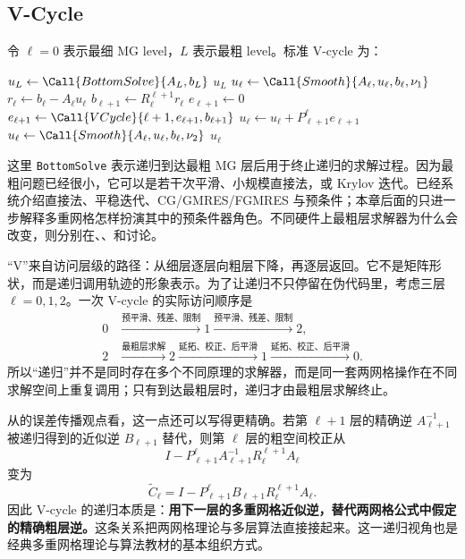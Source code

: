 \subsection{V-Cycle}
\label{sec:v-cycle}

令 $\ell=0$ 表示最细 MG level，$L$ 表示最粗 level。标准 V-cycle 为：
\begin{algorithm}[htbp]
\caption{递归 V-cycle}
\begin{algorithmic}[1]
    \State $u_L\gets\Call{BottomSolve}{A_L,b_L}$
    \State \Return $u_L$
  \EndIf
  \State $u_\ell\gets\Call{Smooth}{A_\ell,u_\ell,b_\ell,\nu_1}$
  \State $r_\ell\gets b_\ell-A_\ell u_\ell$
  \State $b_{\ell+1}\gets R_\ell^{\ell+1}r_\ell$
  \State $e_{\ell+1}\gets0$
  \State $e_{\ell+1}\gets\Call{VCycle}{\ell+1,e_{\ell+1},b_{\ell+1}}$
  \State $u_\ell\gets u_\ell+P_{\ell+1}^{\ell}e_{\ell+1}$
  \State $u_\ell\gets\Call{Smooth}{A_\ell,u_\ell,b_\ell,\nu_2}$
  \State \Return $u_\ell$
\EndFunction
\end{algorithmic}
\end{algorithm}

这里 \texttt{BottomSolve} 表示递归到达最粗 MG 层后用于终止递归的求解过程。因为最粗问题已经很小，它可以是若干次平滑、小规模直接法，或 Krylov 迭代。已经系统介绍直接法、平稳迭代、CG/GMRES/FGMRES 与预条件；本章后面的只进一步解释多重网格怎样扮演其中的预条件器角色。不同硬件上最粗层求解器为什么会改变，则分别在、、和讨论。

“V”来自访问层级的路径：从细层逐层向粗层下降，再逐层返回。它不是矩阵形状，而是递归调用轨迹的形象表示。为了让递归不只停留在伪代码里，考虑三层 $\ell=0,1,2$。一次 V-cycle 的实际访问顺序是
\begin{align}
0&\xrightarrow{\text{预平滑、残差、限制}}1
\xrightarrow{\text{预平滑、残差、限制}}2,
\\
2&\xrightarrow{\text{最粗层求解}}2
\xrightarrow{\text{延拓、校正、后平滑}}1
\xrightarrow{\text{延拓、校正、后平滑}}0.
\end{align}
所以“递归”并不是同时存在多个不同原理的求解器，而是同一套两网格操作在不同求解空间上重复调用；只有到达最粗层时，递归才由最粗层求解终止。

从的误差传播观点看，这一点还可以写得更精确。若第 $\ell+1$ 层的精确逆 $A_{\ell+1}^{-1}$ 被递归得到的近似逆 $B_{\ell+1}$ 替代，则第 $\ell$ 层的粗空间校正从
\begin{equation}
I-P_{\ell+1}^{\ell}A_{\ell+1}^{-1}R_{\ell}^{\ell+1}A_\ell
\end{equation}
变为
\begin{equation}
\widetilde C_\ell
=
I-P_{\ell+1}^{\ell}B_{\ell+1}R_{\ell}^{\ell+1}A_\ell.
\label{eq:mg-recursive-coarse-correction}
\end{equation}
因此 V-cycle 的递归本质是：\textbf{用下一层的多重网格近似逆，替代两网格公式中假定的精确粗层逆。}这条关系把两网格理论与多层算法直接接起来。这一递归视角也是经典多重网格理论与算法教材的基本组织方式\cite{briggs2000,hackbusch1985,trottenberg2001}。


